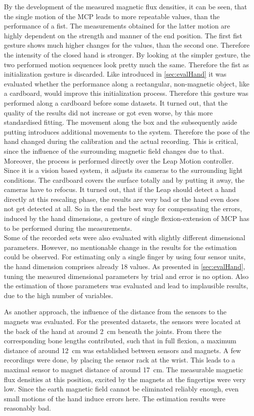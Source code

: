 By the development of the measured magnetic flux densities, it can be seen, that the single motion of the \ac{MCP} leads to more repeatable values, than the performance of a fist. The measurements obtained for the latter motion are highly dependent on the strength and manner of the end position. The first fist gesture shows much higher changes for the values, than the second one. Therefore the intensity of the closed hand is stronger. By looking at the simpler gesture, the two performed motion sequences look pretty much the same. Therefore the fist as initialization gesture is discarded. Like introduced in \ref{sec:evalHand} it was evaluated whether the performance along a rectangular, non-magnetic object, like a cardboard, would improve this initialization process. Therefore this gesture was performed along a cardboard before some datasets. It turned out, that the quality of the results did not increase or got even worse, by this more standardised fitting. The movement along the box and the subsequently aside putting introduces additional movements to the system. Therefore the pose of the hand changed during the calibration and the actual recording. This is critical, since the influence of the surrounding magnetic field changes due to that. Moreover, the process is performed directly over the Leap Motion controller. Since it is a vision based system, it adjusts its cameras to the surrounding light conditions. The cardboard covers the surface totally and by putting it away, the cameras have to refocus. It turned out, that if the Leap should detect a hand directly at this rescaling phase, the results are very bad or the hand even does not get detected at all. So in the end the best way for compensating the errors, induced by the hand dimensions, a gesture of single flexion-extension of \ac{MCP} has to be performed during the measurements.\\
Some of the recorded sets were also evaluated with slightly different dimensional parameters. However, no mentionable change in the results for the estimation could be observed. For estimating only a single finger by using four sensor units, the hand dimension comprises already 18 values. As presented in \ref{sec:evalHand}, tuning the measured dimensional parameters by trial and error is no option. Also the estimation of those parameters was evaluated and lead to implausible results, due to the high number of variables. 
\FloatBarrier


As another approach, the influence of the distance from the sensors to the magnets was evaluated. For the presented datasets, the sensors were located at the back of the hand at around \SI{2}{\cm} beneath the joints. From there the corresponding bone lengths contributed, such that in full flexion, a maximum distance of around \SI{12}{\cm} was established between sensors and magnets. A few recordings were done, by placing the sensor rack at the wrist. This leads to a maximal sensor to magnet distance of around \SI{17}{\cm}. The measurable magnetic flux densities at this position, excited by the magnets at the fingertips were very low. Since the earth magnetic field cannot be eliminated reliably enough, even small motions of the hand induce errors here. The estimation results were reasonably bad.

